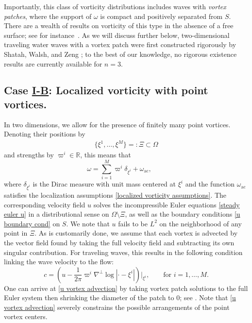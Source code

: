 \documentclass[11pt,reqno]{amsart}
\newcommand{\PV}{\texorpdfstring{\hyperref[sec point]{I-B}}{I-B}}
\newcommand{\R}{\mathbb{R}}
\theoremstyle{plain}
\theoremstyle{remark}
\numberwithin{equation}{section}
\begin{document}
Importantly, this class of vorticity distributions includes waves with \emph{vortex patches}, where the support of $\omega$ is compact and positively separated from $S$.  There are a wealth of results on vorticity of this type in the absence of a free surface; see for instance~\cite[Section~8.3]{majda2002vorticity}.
As we will discuss further below, two-dimensional traveling water waves with a vortex patch were first constructed rigorously by Shatah, Walsh, and Zeng \cite{shatah2013travelling}; to the best of our knowledge, no rigorous existence results are currently available for $n=3$.  

\subsection*{Case \PV: Localized vorticity with point vortices.} \label{sec point}
In two dimensions, we allow for the presence of finitely many point vortices. Denoting their positions by
\begin{align*}
  \{\xi^1, \ldots, \xi^M\} =: \Xi \subset \Omega
\end{align*}
and strengths by $\varpi^i \in \R$, this means that
\begin{equation}
  \label{point vortex assumptions}
  \omega = \sum_{i=1}^M \varpi^i \delta_{\xi^i} + \omega_{\mathrm{ac}},
  \qquad 
\end{equation}
where $\delta_{\xi^i}$ is the Dirac measure with unit mass centered at $\xi^i$ and the function $\omega_{\mathrm{ac}}$ satisfies the localization assumptions \eqref{localized vorticity assumptions}. The corresponding velocity field $u$ solves the incompressible Euler equations \eqref{steady euler u} in a distributional sense on $\Omega \setminus \Xi$, as well as the boundary conditions \eqref{u boundary cond} on $S$.  We note that $u$ fails to be $L^2$ on the neighborhood of any point in $\Xi$. As is customarily done, we assume that each vortex is advected by the vector field found by taking the full velocity field and subtracting its own singular contribution.  For traveling waves, this results in the following condition linking the wave velocity to the flow:
\begin{equation}
  c = \left(u- \frac{1}{2\pi} \varpi^i \nabla^\perp  \log{|\cdot -\xi^i|}  \right)\Big|_{\xi^i}, \qquad \textrm{for } i = 1, \ldots, M. \label{u vortex advection} 
\end{equation}
One can arrive at \eqref{u vortex advection} by taking vortex patch solutions to the full Euler system then shrinking the diameter of the patch to $0$; see \cite[Theorems 4.1, 4.2]{marchioro1994book}. Note that \eqref{u vortex advection} severely constrains the possible arrangements of the point vortex centers.  
\end{document}
